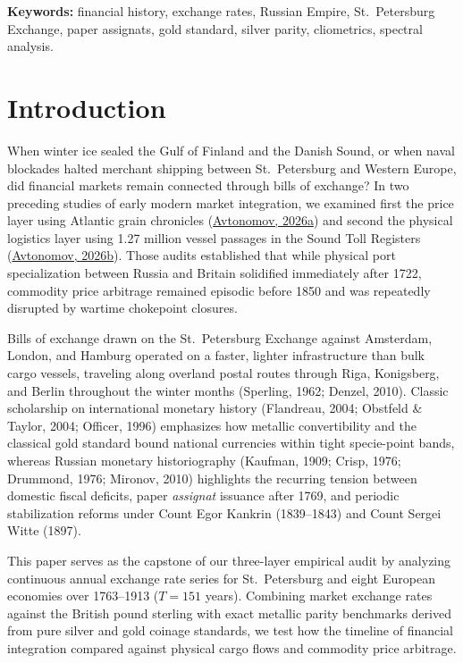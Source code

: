 \documentclass[11pt,a4paper]{article}
\begin{document}
\noindent\textbf{Keywords:} financial history, exchange rates, Russian Empire, St.~Petersburg Exchange, paper assignats, gold standard, silver parity, cliometrics, spectral analysis.

\section{Introduction}

When winter ice sealed the Gulf of Finland and the Danish Sound, or when naval blockades halted merchant shipping between St.~Petersburg and Western Europe, did financial markets remain connected through bills of exchange? In two preceding studies of early modern market integration, we examined first the price layer using Atlantic grain chronicles (\href{https://doi.org}{Avtonomov, 2026a}) and second the physical logistics layer using 1.27 million vessel passages in the Sound Toll Registers (\href{https://doi.org}{Avtonomov, 2026b}). Those audits established that while physical port specialization between Russia and Britain solidified immediately after 1722, commodity price arbitrage remained episodic before 1850 and was repeatedly disrupted by wartime chokepoint closures.

Bills of exchange drawn on the St.~Petersburg Exchange against Amsterdam, London, and Hamburg operated on a faster, lighter infrastructure than bulk cargo vessels, traveling along overland postal routes through Riga, Konigsberg, and Berlin throughout the winter months (Sperling, 1962; Denzel, 2010). Classic scholarship on international monetary history (Flandreau, 2004; Obstfeld \& Taylor, 2004; Officer, 1996) emphasizes how metallic convertibility and the classical gold standard bound national currencies within tight specie-point bands, whereas Russian monetary historiography (Kaufman, 1909; Crisp, 1976; Drummond, 1976; Mironov, 2010) highlights the recurring tension between domestic fiscal deficits, paper \emph{assignat} issuance after 1769, and periodic stabilization reforms under Count Egor Kankrin (1839--1843) and Count Sergei Witte (1897).

This paper serves as the capstone of our three-layer empirical audit by analyzing continuous annual exchange rate series for St.~Petersburg and eight European economies over 1763--1913 ($T = 151$ years). Combining market exchange rates against the British pound sterling with exact metallic parity benchmarks derived from pure silver and gold coinage standards, we test how the timeline of financial integration compared against physical cargo flows and commodity price arbitrage.
\end{document}
